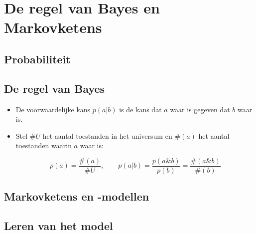\chapter{De regel van Bayes en Markovketens}


\section{Probabiliteit}

\section{De regel van Bayes}
\begin{itemize}
	\item De voorwaardelijke kans $p(a|b)$ is de kans dat $a$ waar is gegeven dat $b$ waar is.
	\item Stel $\#U$ het aantal toestanden in het universum en $\#(a)$ het aantal toestanden waarin $a$ waar is:
	
	$$p(a) = \frac{\#(a)}{\#U}, \qquad p(a|b) = \frac{p(a\& b)}{p(b)} = \frac{\#(a\& b)}{\#(b)}$$
	
	
\end{itemize}
\section{Markovketens en -modellen}

\section{Leren van het model}